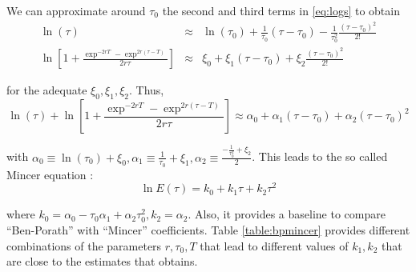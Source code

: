 \indent We can approximate around $\tau_{0}$ the second and third terms in \eqref{eq:logs} to obtain
\begin{eqnarray}
\ln(\tau) &\approx& \ln (\tau_{0}) + \frac{1}{\tau_{0}} \left( \tau - \tau_{0} \right) - \frac{1}{\tau_{0}^2} \frac{\left( \tau - \tau_{0} \right)^2}{2!} \nonumber \\
\ln \left[ 1 + \frac{\exp^{-2rT} - \exp^{2r(\tau - T)} }{2r \tau} \right] &\approx& \xi_{0} + \xi_{1} \left( \tau - \tau_{0} \right) + \xi_{2} \frac{\left( \tau - \tau_{0} \right)^2}{2!}
\end{eqnarray}

\noindent for the adequate $\xi_{0}, \xi_{1}, \xi_{2}$. Thus,
\begin{equation}
\ln(\tau) + \ln \left[ 1 + \frac{\exp^{-2rT} - \exp^{2r(\tau - T)} }{2r \tau} \right] \approx \alpha_{0} + \alpha_{1}\left( \tau - \tau_{0} \right) + \alpha_{2} \left( \tau - \tau_{0} \right)^2
\end{equation}

\noindent with $\alpha_{0} \equiv \ln(\tau_{0}) + \xi_{0}, \alpha_{1} \equiv \frac{1}{\tau_{0}} + \xi_{1}, \alpha_{2} \equiv \frac{-\frac{1}{\tau_{0}^2} + \xi_{2}}{2}$. This leads to the so called Mincer equation \citep[see][]{mincer1974schooling}:
\begin{equation}
\ln E(\tau) = k_{0} + k_{1} \tau + k_{2} \tau^2 \label{eq:mincer}
\end{equation}

\noindent where $k_{0} = \alpha_{0} - \tau_{0} \alpha_{1} + \alpha_{2} \tau_{0}^2, k_{2} = \alpha_{2}$. Also, it provides a baseline to compare ``Ben-Porath'' with ``Mincer'' coefficients. Table \ref{table:bpmincer} provides different combinations of the parameters $r, \tau_{0}, T$ that lead to different values of $k_{1}, k_{2}$ that are close to the estimates that \citet{mincer1974schooling} obtains.

